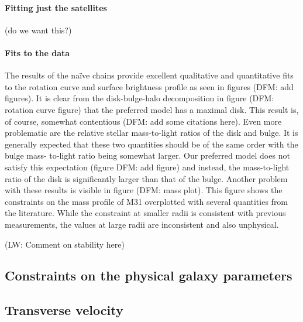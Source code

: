 \documentclass[preprint,12pt]{aastex}
\begin{document}
\paragraph{Fitting just the satellites}

(do we want this?)

\paragraph{Fits to the data}

The results of the na\"ive chains provide excellent qualitative and
quantitative fits to the rotation curve and surface brightness profile
as seen in figures (DFM: add figures). It is clear from the disk-bulge-halo
decomposition in figure (DFM: rotation curve figure) that the preferred
model has a maximal disk. This result is, of course, somewhat contentious
(DFM: add some citations here). Even more problematic are the relative
stellar mass-to-light ratios of the disk and bulge. It is generally expected
that these two quantities should be of the same order with the bulge mass-
to-light ratio being somewhat larger. Our preferred model does not satisfy
this expectation (figure DFM: add figure) and instead, the mass-to-light
ratio of the disk is significantly larger than that of the bulge. Another
problem with these results is visible in figure (DFM: mass plot). This
figure shows the constraints on the mass profile of M31 overplotted with
several quantities from the literature. While the constraint at smaller
radii is consistent with previous measurements, the values at large radii
are inconsistent and also unphysical.

(LW: Comment on stability here)


\subsection{Constraints on the physical galaxy parameters}



\subsection{Transverse velocity}
\end{document}
